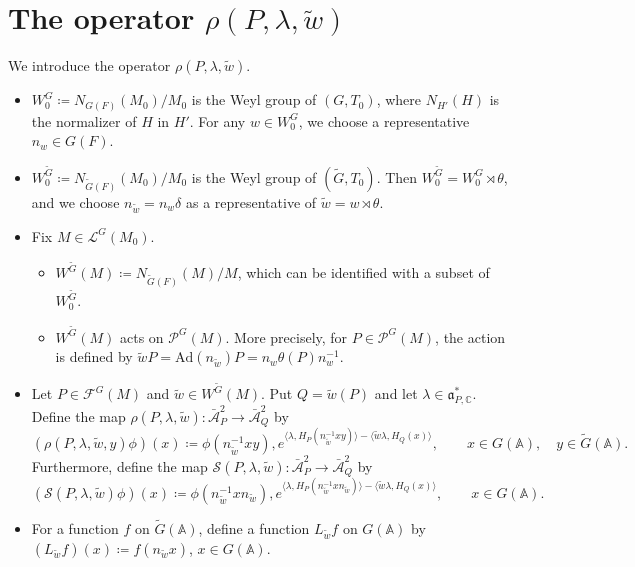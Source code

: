 \documentclass[12pt]{amsart}
\theoremstyle{definition}
\theoremstyle{plain}
\theoremstyle{remark}
\def\C{\mathbb{C}}%
\def\A{\mathbb{A}}%
\newcommand{\fa}{\mathfrak{a}}
\newcommand{\cA}{\mathcal{A}}
\newcommand{\cC}{\mathcal{C}}
\newcommand{\cF}{\mathcal{F}}
\newcommand{\cL}{\mathcal{L}}
\newcommand{\cP}{\mathcal{P}}
\newcommand{\sS}{\mathscr{S}}
\numberwithin{equation}{section}
\newcommand{\tG}{\widetilde{G}}
\newcommand{\tw}{\widetilde{w}}
\begin{document}


\section{The operator \texorpdfstring{$\rho(P,\lambda,\tw)$}{rho}}\label{sec:rho}


We introduce the operator $\rho(P,\lambda,\tw)$.
\begin{itemize}
\item $W_0^G\coloneqq N_{G(F)}(M_0)/M_0$ is the Weyl group of $(G,T_0)$, where $N_{H'}(H)$ is the normalizer of $H$ in $H'$. For any $w\in W_0^G$, we choose a representative $n_w\in G(F)$.
\item $W_0^{\tG}\coloneqq N_{\tG(F)}(M_0)/M_0$ is the Weyl group of $(\tG,T_0)$.
Then $W^{\tG}_0=W^G_0\rtimes\theta$, and we choose $n_{\tw}=n_w\delta$ as a representative of $\tw=w\rtimes \theta$.
\item Fix $M\in\cL^G(M_0)$.
\begin{itemize}
\item $W^{\tG}(M)\coloneqq N_{\tG(F)}(M)/M$, which can be identified with a subset of $W_0^{\tG}$.
\item $W^{\tG}(M)$ acts on $\cP^G(M)$. More precisely, for $P\in \cP^G(M)$, the action is defined by $\tw  P=\mathrm{Ad}(n_{\tw})P=n_w\theta(P)n_w^{-1}$.
\end{itemize}
\item Let $P\in \cF^G(M)$ and $\tw\in W^{\tG}(M)$. Put $Q=\tw(P)$ and let $\lambda\in\fa_{P,\C}^*$.
Define the map $\rho(P,\lambda,\tw)\colon \bar{\cA}^2_P\to\bar{\cA}^2_Q$ by
\[
(\rho(P,\lambda,\tw,y)\phi)(x)\coloneqq \phi(n_{\tw}^{-1}xy) , e^{\langle \lambda,H_P(n_{\tw}^{-1}xy)\rangle -\langle \tw\lambda,H_Q(x)\rangle}, \qquad x\in G(\A),\quad  y\in\tG(\A).
\]
Furthermore, define the map $\sS(P,\lambda,\tw)\colon \bar{\cA}^2_P\to\bar{\cA}^2_Q$ by
\[
(\sS(P,\lambda,\tw)\phi)(x)\coloneqq \phi(n_{\tw}^{-1}xn_{\tw}) , e^{\langle \lambda,H_P(n_{\tw}^{-1}xn_{\tw})\rangle -\langle \tw\lambda,H_Q(x)\rangle}, \qquad x\in G(\A).
\]
\item For a function $f$ on $\tG(\A)$, define a function $L_{\tw}f$ on $G(\A)$ by $(L_{\tw}f)(x)\coloneqq f(n_{\tw}x)$, $x\in G(\A)$.
\end{itemize}
\end{document}
